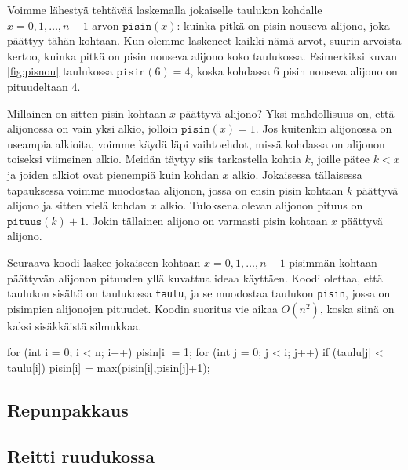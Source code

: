 Voimme lähestyä tehtävää laskemalla jokaiselle taulukon
kohdalle $x=0,1,\dots,n-1$ arvon $\texttt{pisin}(x)$:
kuinka pitkä on pisin nouseva alijono, joka päättyy tähän kohtaan.
Kun olemme laskeneet kaikki nämä arvot, suurin arvoista kertoo,
kuinka pitkä on pisin nouseva alijono koko taulukossa.
Esimerkiksi kuvan \ref{fig:pisnou} taulukossa $\texttt{pisin}(6)=4$,
koska kohdassa $6$ pisin nouseva alijono on pituudeltaan $4$.

Millainen on sitten pisin kohtaan $x$ päättyvä alijono?
Yksi mahdollisuus on, että alijonossa on vain yksi alkio,
jolloin $\texttt{pisin}(x)=1$.
Jos kuitenkin alijonossa on useampia alkioita,
voimme käydä läpi vaihtoehdot, missä kohdassa on alijonon
toiseksi viimeinen alkio.
Meidän täytyy siis tarkastella kohtia $k$, joille pätee $k<x$
ja joiden alkiot ovat pienempiä kuin kohdan $x$ alkio.
Jokaisessa tällaisessa tapauksessa voimme muodostaa alijonon,
jossa on ensin pisin kohtaan $k$ päättyvä alijono ja
sitten vielä kohdan $x$ alkio.
Tuloksena olevan alijonon pituus on $\texttt{pituus}(k)+1$.
Jokin tällainen alijono on varmasti pisin kohtaan $x$ päättyvä alijono.

Seuraava koodi laskee jokaiseen kohtaan $x=0,1,\dots,n-1$
pisimmän kohtaan päättyvän alijonon pituuden yllä kuvattua
ideaa käyttäen.
Koodi olettaa, että taulukon sisältö on taulukossa \texttt{taulu},
ja se muodostaa taulukon \texttt{pisin}, jossa on pisimpien
alijonojen pituudet.
Koodin suoritus vie aikaa $O(n^2)$, koska siinä on kaksi sisäkkäistä silmukkaa.

\begin{code}
for (int i = 0; i < n; i++) {
    pisin[i] = 1;
    for (int j = 0; j < i; j++) {
        if (taulu[j] < taulu[i]) {
            pisin[i] = max(pisin[i],pisin[j]+1);
        }
    }
}
\end{code}

\subsection{Repunpakkaus}

\subsection{Reitti ruudukossa}
